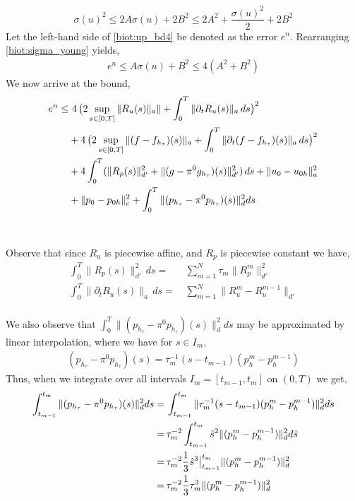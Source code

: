 \begin{equation} \label{biot:sigma_young}
\sigma(u)^2 \leq 2A \sigma(u) + 2B^2 \leq 2A^2 + \frac{\sigma(u)^2}{2} + 2B^2
\end{equation}
Let the left-hand side of \eqref{biot:up_bd4} be denoted as the error $e^n$. Rearranging \eqref{biot:sigma_young} yields,
\begin{align} \label{biot:error1}
e^n \leq A\sigma(u) + B^2 \leq 4(A^2 + B^2)
\end{align}
We now arrive at the bound,
\begin{align}
e^n \leq & \, \, 4\, \bigl(2 \sup_{s \in [0,T]} \| R_u(s)\|_a\| + \int_0^{T} \| \partial_t R_u (s)\|_a \, ds  \bigr)^2 \\
& + 4\, \bigl( 2 \sup_{s \in [0,T]} \| (f - f_{h_\tau})(s)\|_a + \int_0^{T} \| \partial_t (f - f_{h_\tau})(s)\|_a \, ds \bigr)^2  \notag\\
& + 4 \int_0^{T} (\| R_p(s)\|^2_{d'}  + \|(g-\pi^0g_{h_\tau})(s)\|^2_{d'} ) \, ds + \|u_0 - u_{0 h} \|^2_a \notag\\
& + \|p_0 - p_{0 h} \|^2_c + \int_0^{T} \|(p_{h_\tau}-\pi^0p_{h_\tau})(s)\|_d^2 ds \notag
\end{align}
\\
\\
Observe that since $R_u$ is piecewise affine, and $R_p$ is piecewise constant we have,
\begin{align}\label{biot:affine1}
\int_0^{T} \| R_p(s)\|^2_{d'}\, ds = & \, \sum_{m=1}^N \tau_m \| R_p^m\|^2_{d'} \\
\int_0^{T} \| \partial_t R_u (s)\|_a \, ds = & \, \sum_{m=1}^N \| R_u^m - R_u^{m-1}\|_{d'} \label{biot:affine2}
\end{align}
\\
We also observe that $\int_0^{T} \|(p_{h_\tau}-\pi^0p_{h_\tau})(s)\|_d^2 ds$ may be approximated by linear interpolation, where we have for $s \in I_m$,
\\
\begin{align}
(p_{h_\tau}-\pi^0p_{h_\tau})(s)=\tau_m^{-1}(s-t_{m-1})(p_h^m - p_h^{m-1})
\end{align}
Thus, when we integrate over all intervals $I_m = [t_{m-1}, t_m]$ on $(0,T)$ we get,
\begin{align}
\int_{t_{m-1}}^{t_m} \|(p_{h_\tau}-\pi^0p_{h_\tau})(s)\|_d^2 ds = & \, \int_{t_{m-1}}^{t_m} \|\tau_m^{-1}(s-t_{m-1})(p_h^m - p_h^{m-1})\|_d^2 ds \\
= & \, \tau_m^{-2}\int_{t_{m-1}}^{t_m} \hat{s}^2\|(p_h^m - p_h^{m-1})\|_d^2 d\hat{s} \notag\\
= & \, \tau_m^{-2} \frac{1}{3}\hat{s}^3\big|_{t_{m-1}}^{t_m} \|(p_h^m - p_h^{m-1})\|_d^2 \notag\\
= & \, \tau_m^{-2} \frac{1}{3}\tau_m^3 \|(p_h^m - p_h^{m-1})\|_d^2 \notag
\end{align}
